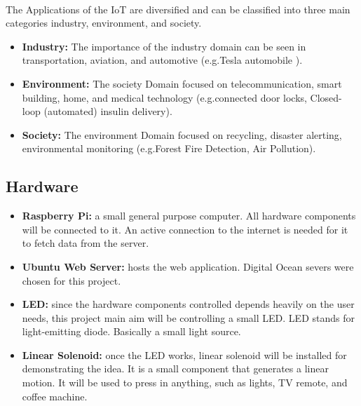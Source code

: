 \documentclass[12pt, oneside, a4paper]{book}
\newcommand\boldcolor[1]{\textcolor{bold}{\textbf{#1}}}
\begin{document}
			\paragraph{}The Applications of the IoT are diversified and can be classified into three main
			categories industry, environment, and society.
			\begin{itemize}
			\item \boldcolor{Industry:} The importance of the industry domain can be seen in transportation,
			aviation, and automotive (e.g.Tesla automobile ).
			\item \boldcolor{Environment:} The society Domain focused on telecommunication, smart building,
			home, and medical technology (e.g.connected door locks, Closed-loop (automated)
			insulin delivery).
			\item \boldcolor{Society:} The environment Domain focused on recycling, disaster alerting,
			environmental monitoring (e.g.Forest Fire Detection, Air Pollution)\cite{iot_5}.
			\end{itemize}
			\subsection{Hardware}
				\begin{itemize}
				\item \boldcolor{Raspberry Pi:} a small general purpose computer. All hardware components will be connected to it. An active connection to the internet is needed for it to fetch data from the server\cite{raspberry}. %
				\item \boldcolor{Ubuntu Web Server:} hosts the web application. Digital Ocean severs\cite{digital_ocean} were chosen for this project.
				
				\item \boldcolor{LED:} since the hardware components controlled depends heavily on the user needs, this project main aim will be controlling a small LED. LED stands for light-emitting diode\cite{led}. Basically a small light source. %
				\item \boldcolor{Linear Solenoid:} once the LED works, linear solenoid will be installed for demonstrating the idea\cite{linear}. It is a small component that generates a linear motion. It will be used to press in anything, such as lights, TV remote, and coffee machine. %
				\end{itemize}
				
\end{document}
